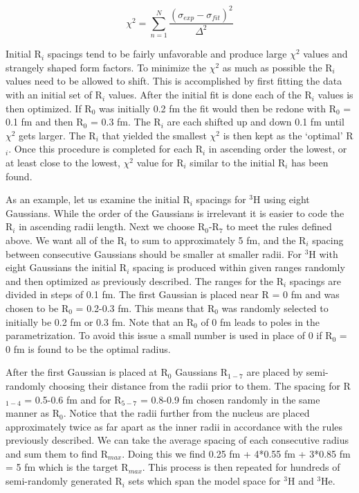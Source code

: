 \begin{equation} \label{eq:chi2}
	\chi^2 = \sum_{n=1}^N \frac{\left( \sigma_{exp}-\sigma_{fit} \right)^2}{\Delta^2}
\end{equation}

Initial R$_i$ spacings tend to be fairly unfavorable and produce large $\chi^2$ values and strangely shaped form factors. To minimize the $\chi^2$ as much as possible the R$_i$ values need to be allowed to shift. This is accomplished by first fitting the data with an initial set of R$_i$ values. After the initial fit is done each of the R$_i$ values is then optimized. If R$_0$ was initially 0.2 fm the fit would then be redone with R$_0$ = 0.1 fm and then R$_0$ = 0.3 fm. The R$_i$ are each shifted up and down 0.1 fm until $\chi^2$ gets larger. The R$_i$ that yielded the smallest $\chi^2$ is then kept as the `optimal' R$_i$. Once this procedure is completed for each R$_i$ in ascending order the lowest, or at least close to the lowest, $\chi^2$ value for R$_i$ similar to the initial R$_i$ has been found.  

As an example, let us examine the initial R$_i$ spacings for $^3$H using eight Gaussians. While the order of the Gaussians is irrelevant it is easier to code the R$_i$ in ascending radii length. Next we choose R$_0$-R$_7$ to meet the rules defined above. We want all of the R$_i$ to sum to approximately 5 fm, and the R$_i$ spacing between consecutive Gaussians should be smaller at smaller radii. For $^3$H with eight Gaussians the initial R$_i$ spacing is produced within given ranges randomly and then optimized as previously described. The ranges for the R$_i$ spacings are divided in steps of 0.1 fm. The first Gaussian is placed near R = 0 fm and was chosen to be R$_0$ = 0.2-0.3 fm. This means that R$_0$ was randomly selected to initially be 0.2 fm or 0.3 fm. Note that an R$_0$ of 0 fm leads to poles in the parametrization. To avoid this issue a small number is used in place of 0 if R$_0$ = 0 fm is found to be the optimal radius. 

After the first Gaussian is placed at R$_0$ Gaussians R$_{1-7}$ are placed by semi-randomly choosing their distance from the radii prior to them. The spacing for R$_{1-4}$ = 0.5-0.6 fm and for R$_{5-7}$ = 0.8-0.9 fm chosen randomly in the same manner as R$_0$. Notice that the radii further from the nucleus are placed approximately twice as far apart as the inner radii in accordance with the rules previously described. We can take the average spacing of each consecutive radius and sum them to find R$_{max}$. Doing this we find 0.25 fm + 4*0.55 fm + 3*0.85 fm = 5 fm which is the target R$_{max}$. This process is then repeated for hundreds of semi-randomly generated R$_i$ sets which span the model space for $^3$H and $^3$He. 

